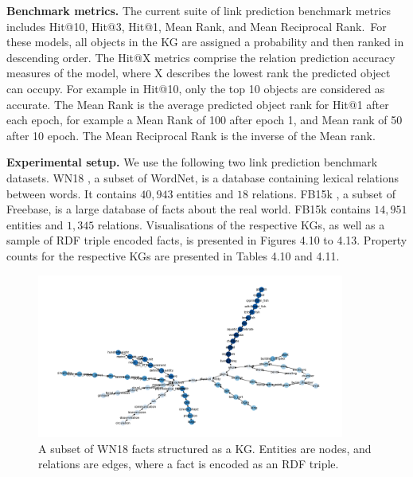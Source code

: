 \noindent \textbf{Benchmark metrics.} The current suite of link prediction benchmark metrics includes Hit@10, Hit@3, Hit@1, Mean Rank, and Mean Reciprocal Rank.\ For these models, all objects in the KG are assigned a probability and then ranked in descending order. The Hit@X metrics comprise the relation prediction accuracy measures of the model, where X describes the lowest rank the predicted object can occupy. For example in Hit@10, only the top 10 objects are considered as accurate. The Mean Rank is the average predicted object rank for Hit@1 after each epoch, for example a Mean Rank of 100 after epoch 1, and Mean rank of 50 after 10 epoch. The Mean Reciprocal Rank is the inverse of the Mean rank. \par

\noindent \textbf{Experimental setup.} We use the following two link prediction benchmark datasets. WN18 \citep{bordes2013translating}, a subset of WordNet, is a database containing lexical relations between words. It contains $ 40, 943 $ entities and $ 18 $ relations. FB15k \citep{bordes2013translating}, a subset of Freebase, is a large database of facts about the real world. FB15k contains $ 14, 951 $ entities and $ 1, 345 $ relations. Visualisations of the respective KGs, as well as a sample of RDF triple encoded facts, is presented in Figures 4.10 to 4.13. Property counts for the respective KGs are presented in Tables 4.10 and 4.11. \par

\bigskip

\begin{figure}[H]
   	\centering
    	\includegraphics[width=0.9\textwidth, height=0.5\textwidth]{WN18_Graph}
	\captionsetup{justification=centering}
	\caption{A subset of WN18 facts structured as a KG. Entities are nodes, and relations are edges, where a fact is encoded as an RDF triple.}
\end{figure}

